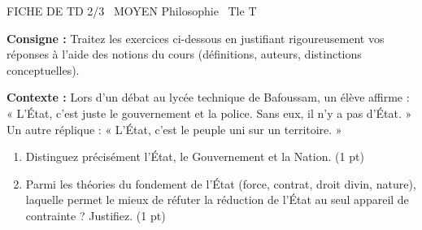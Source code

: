 \documentclass[11pt]{article}
\begin{document}
\begin{tcolorbox}[enhanced,colback=popink,colframe=popink,arc=10pt,boxrule=0pt,left=12pt,right=12pt,top=9pt,bottom=9pt]
{\color{white}\popxbold\small FICHE DE TD 2/3 \textbullet\ MOYEN \hfill Philosophie \textbullet\ Tle T\par}
\end{tcolorbox}
\vspace{4pt}
\noindent \textbf{Consigne :} Traitez les exercices ci-dessous en justifiant rigoureusement vos réponses à l'aide des notions du cours (définitions, auteurs, distinctions conceptuelles).

\begin{exercice}
\textbf{Contexte :} Lors d'un débat au lycée technique de Bafoussam, un élève affirme : « L'État, c'est juste le gouvernement et la police. Sans eux, il n'y a pas d'État. » Un autre réplique : « L'État, c'est le peuple uni sur un territoire. »
\begin{enumerate}
    \item Distinguez précisément l'État, le Gouvernement et la Nation. (1 pt)
    \item Parmi les théories du fondement de l'État (force, contrat, droit divin, nature), laquelle permet le mieux de réfuter la réduction de l'État au seul appareil de contrainte ? Justifiez. (1 pt)
\end{enumerate}
\end{exercice}
\end{document}
